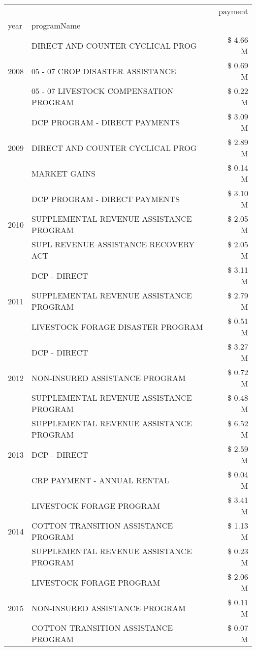 \begin{tabular}{llr}
\toprule
 &  & payment \\
year & programName &  \\
\midrule
\multirow[t]{3}{*}{2008} & DIRECT AND COUNTER CYCLICAL PROG & \$ 4.66 M \\
 & 05 - 07 CROP DISASTER ASSISTANCE & \$ 0.69 M \\
 & 05 - 07 LIVESTOCK COMPENSATION PROGRAM & \$ 0.22 M \\
\cline{1-3}
\multirow[t]{3}{*}{2009} & DCP PROGRAM - DIRECT PAYMENTS & \$ 3.09 M \\
 & DIRECT AND COUNTER CYCLICAL PROG & \$ 2.89 M \\
 & MARKET GAINS & \$ 0.14 M \\
\cline{1-3}
\multirow[t]{3}{*}{2010} & DCP PROGRAM - DIRECT PAYMENTS & \$ 3.10 M \\
 & SUPPLEMENTAL REVENUE ASSISTANCE PROGRAM & \$ 2.05 M \\
 & SUPL REVENUE ASSISTANCE RECOVERY ACT & \$ 2.05 M \\
\cline{1-3}
\multirow[t]{3}{*}{2011} & DCP - DIRECT & \$ 3.11 M \\
 & SUPPLEMENTAL REVENUE ASSISTANCE PROGRAM & \$ 2.79 M \\
 & LIVESTOCK FORAGE DISASTER PROGRAM & \$ 0.51 M \\
\cline{1-3}
\multirow[t]{3}{*}{2012} & DCP - DIRECT & \$ 3.27 M \\
 & NON-INSURED ASSISTANCE PROGRAM & \$ 0.72 M \\
 & SUPPLEMENTAL REVENUE ASSISTANCE PROGRAM & \$ 0.48 M \\
\cline{1-3}
\multirow[t]{3}{*}{2013} & SUPPLEMENTAL REVENUE ASSISTANCE PROGRAM & \$ 6.52 M \\
 & DCP - DIRECT & \$ 2.59 M \\
 & CRP PAYMENT - ANNUAL RENTAL & \$ 0.04 M \\
\cline{1-3}
\multirow[t]{3}{*}{2014} & LIVESTOCK FORAGE PROGRAM & \$ 3.41 M \\
 & COTTON TRANSITION ASSISTANCE PROGRAM & \$ 1.13 M \\
 & SUPPLEMENTAL REVENUE ASSISTANCE PROGRAM & \$ 0.23 M \\
\cline{1-3}
\multirow[t]{3}{*}{2015} & LIVESTOCK FORAGE PROGRAM & \$ 2.06 M \\
 & NON-INSURED ASSISTANCE PROGRAM & \$ 0.11 M \\
 & COTTON TRANSITION ASSISTANCE PROGRAM & \$ 0.07 M \\

\end{tabular}
